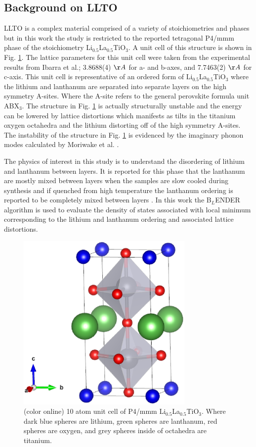 \documentclass[aps,pre,reprint,superscriptaddress,showkeys]{revtex4-1}
\begin{document}
\subsection{Background on LLTO}
LLTO is a complex material comprised of a variety of stoichiometries and phases but in this work the study is restricted to the reported tetragonal P4/mmm phase of the stoichiometry Li$_{0.5}$La$_{0.5}$TiO$_{3}$\cite{LLTOreview,P4mmmstrucuture}. A unit cell of this structure is shown in Fig. \ref{LLTO_unit_cell}. The lattice parameters for this unit cell were taken from the experimental results from Ibarra et al.\cite{P4mmmstrucuture}; 3.8688(4) $\AA$ for a- and b-axes, and 7.7463(2) $\AA$ for c-axis.  This unit cell is representative of an ordered form of Li$_{0.5}$La$_{0.5}$TiO$_{3}$ where the lithium and lanthanum are separated into separate layers on the high symmetry A-sites. Where the A-site refers to the general perovskite formula unit ABX$_3$.  The structure in Fig. \ref{LLTO_unit_cell} is actually structurally unstable and the energy can be lowered by lattice distortions which manifests as tilts in the titanium oxygen octahedra and the lithium  distorting off of the high symmetry A-sites. The instability of the structure in Fig. \ref{LLTO_unit_cell} is evidenced by the imaginary phonon modes calculated by Moriwake et al. \cite{imaginary_phonons}.  

The physics of interest in this study is to understand the disordering of lithium and lanthanum between layers.  It is reported for this phase that the lanthanum are mostly mixed between layers when the samples are slow cooled during synthesis and if quenched from high temperature the lanthanum ordering is reported to be completely mixed between layers \cite{P4mmmstrucuture}. In this work the B$_L$ENDER algorithm is used to evaluate the density of states associated with local minimum corresponding to  the lithium and lanthanum ordering and associated lattice distortions.   
\begin{figure}[h!]
\includegraphics[width=8.6cm]{fig6.eps}
\caption{(color online) 10 atom unit cell of P4/mmm Li$_{0.5}$La$_{0.5}$TiO$_{3}$. Where dark blue spheres are lithium, green spheres are lanthanum, red spheres are oxygen, and grey spheres inside of octahedra are titanium.\label{LLTO_unit_cell}}
\end{figure}
\end{document}

